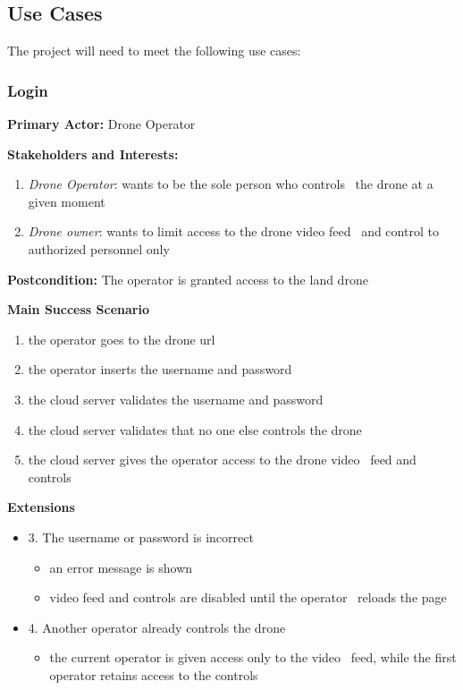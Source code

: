 \subsection{Use Cases}
\label{subsec:use-cases}
The project will need to meet the following use cases:

\subsubsection{\textbf{Login}}

\textbf{Primary Actor:} Drone Operator

\textbf{Stakeholders and Interests:}
\begin{enumerate}
    \item \textit{Drone Operator}: wants to be the sole person who controls \
            the drone at a given moment
    \item \textit{Drone owner}: wants to limit access to the drone video feed \
            and control to authorized personnel only
\end{enumerate}

\textbf{Postcondition:} The operator is granted access to the land drone

\textbf{Main Success Scenario}
\begin{enumerate}
    \item the operator goes to the drone url
    \item the operator inserts the username and password
    \item the cloud server validates the username and password
    \item the cloud server validates that no one else controls the drone
    \item the cloud server gives the operator access to the drone video \
            feed and controls
\end{enumerate}

\textbf{Extensions}
\begin{itemize}
    \item 3. The username or password is incorrect
        \begin{itemize}
            \item an error message is shown
            \item video feed and controls are disabled until the operator \
                    reloads the page
        \end{itemize}
    \item 4. Another operator already controls the drone
        \begin{itemize}
            \item the current operator is given access only to the video \
                    feed, while the first operator retains access to the controls
        \end{itemize}
\end{itemize}


